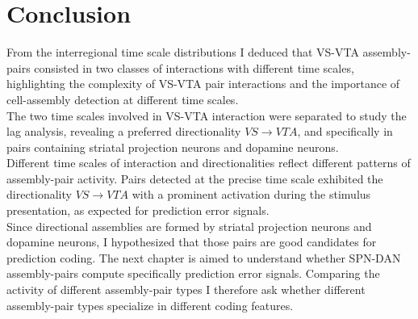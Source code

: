 \section{Conclusion}
From the interregional time scale distributions I deduced that VS-VTA assembly-pairs consisted in two classes of interactions with different time scales, highlighting the complexity of VS-VTA pair interactions and the importance of cell-assembly detection at different time scales.\\The two time scales involved in VS-VTA interaction were separated to study the lag analysis, revealing a preferred directionality $VS\rightarrow VTA$, and specifically in pairs containing striatal projection neurons and dopamine neurons.\\Different time scales of interaction and directionalities reflect different patterns of assembly-pair activity. Pairs detected at the precise time scale exhibited the directionality $VS\rightarrow VTA$ with a prominent activation during the stimulus presentation, as expected for prediction error signals.\\Since directional assemblies are formed by striatal projection neurons and dopamine neurons, I hypothesized that those pairs are good candidates for prediction coding. The next chapter is aimed to understand whether SPN-DAN assembly-pairs compute specifically prediction error signals. Comparing the activity of different assembly-pair types I therefore ask whether different assembly-pair types specialize in different coding features.\\


